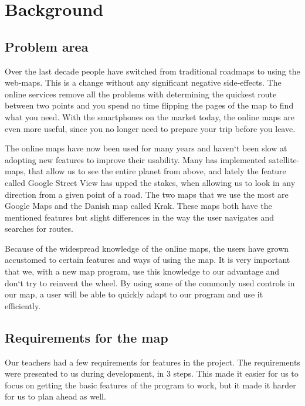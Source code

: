 \chapter{Background}
\label{BG}
\section{Problem area}
\label{BG-PR}
Over the last decade people have switched from traditional roadmaps 
to using the web-maps. This is a change without any significant negative side-effects. 
The online services remove all the problems with determining the quickest 
route between two points and you spend no time flipping the pages of 
the map to find what you need. With the smartphones on the market today, 
the online maps are even more useful, since you no longer need to 
prepare your trip before you leave.

The online maps have now been used for many years and haven`t been slow 
at adopting new features to improve their usability. Many has 
implemented satellite-maps, that allow us to see the entire planet 
from above, and lately the feature called Google Street View has upped 
the stakes, when allowing us to look in any direction from a given point 
of a road. The two maps that we use the most are Google Maps and the 
Danish map called Krak. These maps both have the mentioned features 
but slight differences in the way the user navigates and searches 
for routes.

Because of the widespread knowledge of the online maps, the users 
have grown accustomed to certain features and ways of using the map. 
It is very important that we, with a new map program, use this knowledge 
to our advantage and don`t try to reinvent the wheel. By using some 
of the commonly used controls in our map, a user will be able to quickly 
adapt to our program and use it efficiently. 

\section{Requirements for the map}
\label{BG-R}
Our teachers had a few requirements for features in the project. The
requirements were presented to us during development, in 3 steps. This made it
easier for us to focus on getting the basic features of the program to work, but
it made it harder for us to plan ahead as well.

